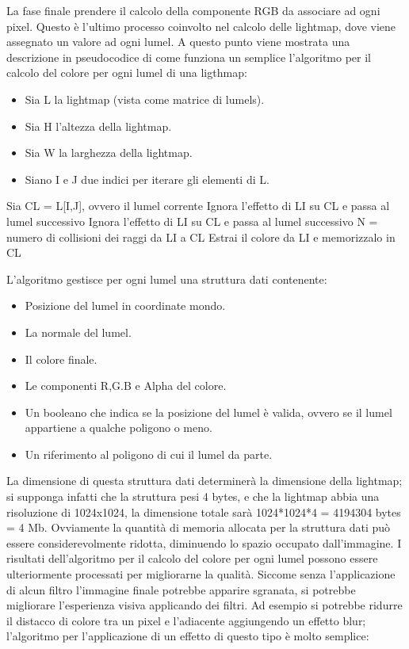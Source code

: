 La fase finale prendere il calcolo della componente RGB da associare ad ogni pixel.
Questo è l’ultimo processo coinvolto nel calcolo delle lightmap, dove viene assegnato un valore ad ogni lumel. A questo punto viene mostrata una descrizione in pseudocodice di come funziona un semplice l’algoritmo per il calcolo del colore per ogni lumel di una ligthmap:

\begin{itemize}
\item Sia L la lightmap (vista come matrice di lumels).
\item Sia H l'altezza della lightmap.
\item Sia W la larghezza della lightmap.
\item Siano I e J due indici per iterare gli elementi di L.
\end{itemize}
 
\begin{algorithm}[H]
  {
   { 
   Sia CL = L[I,J], ovvero il lumel corrente\;
    {
     {
     Ignora l'effetto di LI su CL e passa al lumel successivo\;
     }
	 {
     Ignora l'effetto di LI su CL e passa al lumel successivo\;
     }
	 {
     N = numero di collisioni dei raggi da LI a CL\;
     }
	 {
     Estrai il colore da LI e memorizzalo in CL\;
     }
    }
   }
  }
\end{algorithm}

L’algoritmo gestisce per ogni lumel una struttura dati contenente:
\begin{itemize}
\item Posizione del lumel in coordinate mondo.
\item La normale del lumel.
\item Il colore finale.
\item Le componenti R,G.B e Alpha del colore.
\item Un booleano che indica se la posizione del lumel è valida, ovvero se il lumel appartiene a qualche poligono o meno.
\item Un riferimento al poligono di cui il lumel da parte. 
\end{itemize}
La dimensione di questa struttura dati determinerà la dimensione della lightmap; si supponga infatti che la struttura pesi 4 bytes, e che la lightmap abbia una risoluzione di 1024x1024, la dimensione totale sarà 1024*1024*4 = 4194304 bytes = 4 Mb. Ovviamente la quantità di memoria allocata per la struttura dati può essere considerevolmente ridotta, diminuendo lo spazio occupato dall’immagine.
I risultati dell’algoritmo per il calcolo del colore per ogni lumel possono essere ulteriormente processati per migliorarne la qualità.
Siccome senza l’applicazione di alcun filtro l’immagine finale potrebbe apparire sgranata, si potrebbe migliorare l’esperienza visiva applicando dei filtri. 
Ad esempio si potrebbe ridurre il distacco di colore tra un pixel e l’adiacente aggiungendo un effetto blur; l’algoritmo per l’applicazione di un effetto di questo tipo è molto semplice:


